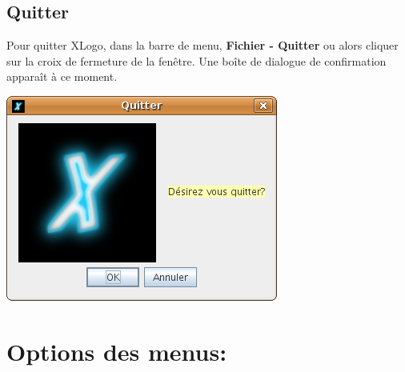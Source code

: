 \section{Quitter}
Pour quitter XLogo, dans la barre de menu, \textbf{Fichier - Quitter} ou alors cliquer sur la croix de fermeture de la fenêtre. Une boîte de dialogue de confirmation apparaît à ce moment.
\begin{center}
 \includegraphics[scale=0.4]{images/CaptureQuitter.png}
\end{center}
\chapter{Options des menus:}
